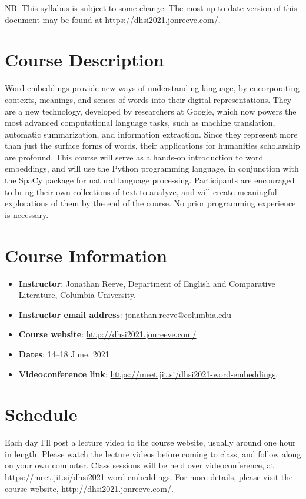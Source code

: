 \documentclass[a4paper]{report}
\begin{document}
NB: This syllabus is subject to some change. The most up-to-date version of this document may be found at \url{https://dhsi2021.jonreeve.com/}.

\section{Course Description}

Word embeddings provide new ways of understanding language, by encorporating contexts, meanings, and senses of words into their digital representations. They are a new technology, developed by researchers at Google, which now powers the most advanced computational language tasks, such as machine translation, automatic summarization, and information extraction. Since they represent more than just the surface forms of words, their applications for humanities scholarship are profound. This course will serve as a hands-on introduction to word embeddings, and will use the Python programming language, in conjunction with the SpaCy package for natural language processing. Participants are encouraged to bring their own collections of text to analyze, and will create meaningful explorations of them by the end of the course. No prior programming experience is necessary.

\section{Course Information}

\begin{itemize}
\item \textbf{Instructor}: Jonathan Reeve, Department of English and Comparative Literature, Columbia University.
\item \textbf{Instructor email address}: jonathan.reeve@columbia.edu
\item \textbf{Course website}: \url{http://dhsi2021.jonreeve.com/}
\item \textbf{Dates}: 14–18 June, 2021
\item \textbf{Videoconference link}: \url{https://meet.jit.si/dhsi2021-word-embeddings}.

\end{itemize}

\section{Schedule}

Each day I'll post a lecture video to the course website, usually around one hour in length. Please watch the lecture videos before coming to class, and follow along on your own computer. Class sessions will be held over videoconference, at \url{https://meet.jit.si/dhsi2021-word-embeddings}. For more details, please visit the course website, \url{http://dhsi2021.jonreeve.com/}.
\end{document}

